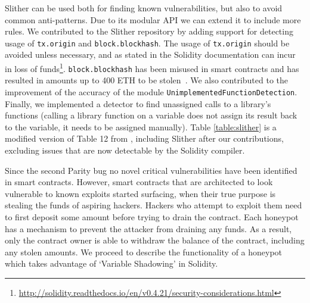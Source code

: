 Slither can be used both for finding known vulnerabilities, but also to avoid common anti-patterns. Due to its modular API we can extend it to include more rules. We contributed to the Slither repository by adding support for detecting usage of \texttt{tx.origin} and \texttt{block.blockhash}. The usage of \texttt{tx.origin} should be avoided unless necessary, and as stated in the Solidity documentation can incur in loss of funds\footnote{\url{http://solidity.readthedocs.io/en/v0.4.21/security-considerations.html}}. \texttt{block.blockhash} has been misused in smart contracts and has resulted in amounts up to 400 ETH to be stolen~\cite{smartbillions}. We also contributed to the improvement of the accuracy of the module \texttt{UnimplementedFunctionDetection}. Finally, we implemented a detector to find unassigned calls to a library's functions (calling a library function on a variable does not assign its result back to the variable, it needs to be assigned manually). Table \ref{table:slither} is a modified version of Table 12 from \cite{tools}, including Slither after our contributions, excluding issues that are now detectable by the Solidity compiler. %



Since the second Parity bug no novel critical vulnerabilities have been identified in smart contracts. However, smart contracts that are architected to look vulnerable to known exploits started surfacing, when their true purpose is stealing the funds of aspiring hackers. %
Hackers who attempt to exploit them need to first deposit some amount before trying to drain the contract. Each honeypot has a mechanism to prevent the attacker from draining any funds. As a result, only the contract owner is able to withdraw the balance of the contract, including any stolen amounts. %
We proceed to describe the functionality of a honeypot which takes advantage of `Variable Shadowing' in Solidity. 

